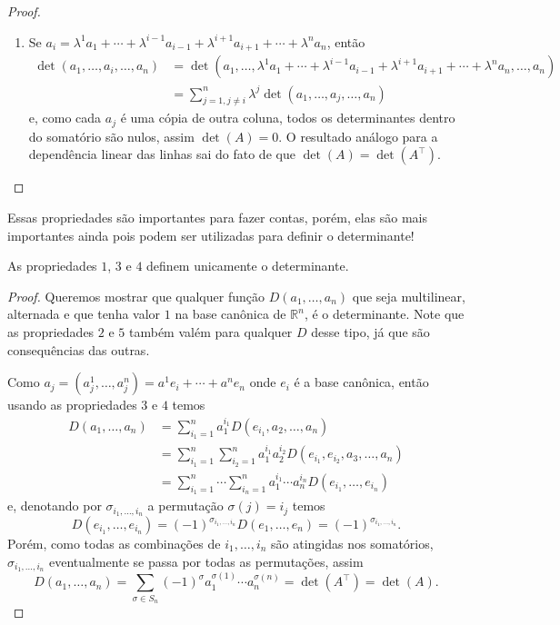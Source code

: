 \begin{proof}
\begin{enumerate}
        \item Se $a_i = \lambda^1 a_1 + \cdots + \lambda^{i-1}a_{i-1} + \lambda^{i+1}a_{i+1} + \cdots + \lambda^n a_n$, então \begin{align}
            \det(a_1, \dots, a_i, \dots, a_n) &= \det(a_1, \dots, \lambda^1 a_1 + \cdots + \lambda^{i-1}a_{i-1} + \lambda^{i+1}a_{i+1} + \cdots + \lambda^n a_n, \dots, a_n) \\ &= \sum_{j = 1, j \neq i}^n \lambda^j \det(a_1, \dots, a_j, \dots, a_n)
        \end{align} e, como cada $a_j$ é uma cópia de outra coluna, todos os determinantes dentro do somatório são nulos, assim $\det(A) = 0$. O resultado análogo para a dependência linear das linhas sai do fato de que $\det(A) = \det(A^\top)$.
    \end{enumerate}
\end{proof}

Essas propriedades são importantes para fazer contas, porém, elas são mais importantes ainda pois podem ser utilizadas para definir o determinante!

\begin{proposition}
    As propriedades $1$, $3$ e $4$ definem unicamente o determinante.
\end{proposition}
\begin{proof}
    Queremos mostrar que qualquer função $D(a_1, \dots, a_n)$ que seja multilinear, alternada e que tenha valor $1$ na base canônica de $\mathbb{R}^n$, é o determinante. Note que as propriedades $2$ e $5$ também valém para qualquer $D$ desse tipo, já que são consequências das outras.

    Como $a_j = (a^1_j, \dots, a^n_j) = a^1e_i + \cdots + a^ne_n$ onde $e_i$ é a base canônica, então usando as propriedades $3$ e $4$ temos \begin{align}
        D(a_1, \dots, a_n) &= \sum_{i_1 = 1}^n a^{i_1}_1 D(e_{i_1}, a_2, \dots, a_n) \\ &= \sum_{i_1 = 1}^n \sum_{i_2 = 1}^n a^{i_1}_1 a^{i_2}_2 D(e_{i_1}, e_{i_2}, a_3, \dots, a_n) \\ &= \sum_{i_1 = 1}^n \cdots \sum_{i_n = 1}^n a^{i_1}_1 \cdots a^{i_n}_n D(e_{i_1}, \dots, e_{i_n})
    \end{align} e, denotando por $\sigma_{i_1, \dots, i_n}$ a permutação $\sigma(j) = i_j$ temos \begin{equation}
        D(e_{i_1}, \dots, e_{i_n}) = (-1)^{\sigma_{i_1, \dots, i_n}} D(e_1, \dots, e_n) = (-1)^{\sigma_{i_1, \dots, i_n}}.
    \end{equation} Porém, como todas as combinações de $i_1, \dots, i_n$ são atingidas nos somatórios, $\sigma_{i_1, \dots, i_n}$ eventualmente se passa por todas as permutações, assim \begin{equation}
        D(a_1, \dots, a_n) = \sum_{\sigma \in S_n} (-1)^\sigma a^{\sigma(1)}_1 \cdots a^{\sigma(n)}_n = \det(A^\top) = \det(A).
    \end{equation}
\end{proof}

